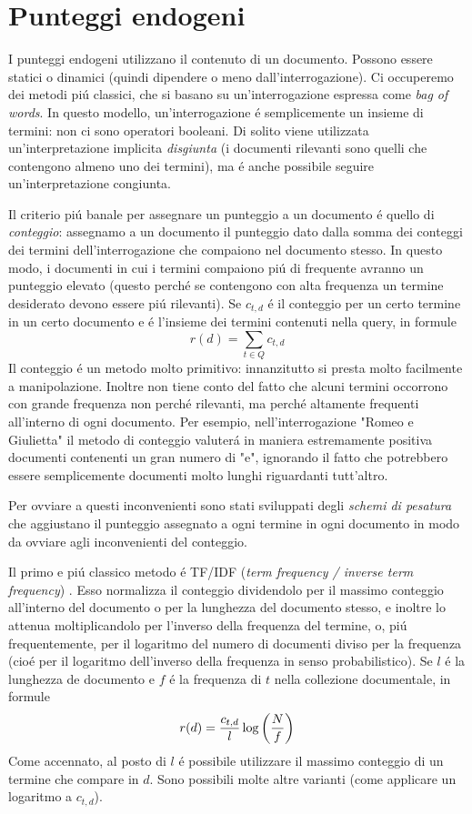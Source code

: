 \section{Punteggi endogeni}
I punteggi endogeni utilizzano il contenuto di un documento. Possono essere statici o dinamici (quindi dipendere o meno dall'interrogazione). Ci occuperemo dei metodi piú classici, che si basano su un'interrogazione espressa come \textit{bag of words}. In questo modello, un'interrogazione é semplicemente un insieme di termini: non ci sono operatori booleani. Di solito viene utilizzata un'interpretazione implicita \textit{disgiunta} (i documenti rilevanti sono quelli che contengono almeno uno dei termini), ma é anche possibile seguire un'interpretazione congiunta.

Il criterio piú banale per assegnare un punteggio a un documento é quello di \textit{conteggio}: assegnamo a un documento il punteggio dato dalla somma dei conteggi dei termini dell'interrogazione che compaiono nel documento stesso. In questo modo, i documenti in cui i termini compaiono piú di frequente avranno un punteggio elevato (questo perché se contengono con alta frequenza un termine desiderato devono essere piú rilevanti). Se $c_{t, d}$ é il conteggio per un certo termine in un certo documento e  é l'insieme dei termini contenuti nella query, in formule
\begin{equation*}
    r(d) = \sum_{t \in Q}{c_{t, d}}
\end{equation*}
Il conteggio é un metodo molto primitivo: innanzitutto si presta molto facilmente a manipolazione. Inoltre non tiene conto del fatto che alcuni termini occorrono con grande frequenza non perché rilevanti, ma perché altamente frequenti all'interno di ogni documento. Per esempio, nell'interrogazione "Romeo e Giulietta" il metodo di conteggio valuterá in maniera estremamente positiva documenti contenenti un gran numero di "e", ignorando il fatto che potrebbero essere semplicemente documenti molto lunghi riguardanti tutt'altro.

Per ovviare a questi inconvenienti sono stati sviluppati degli \textit{schemi di pesatura} che aggiustano il punteggio assegnato a ogni termine in ogni documento in modo da ovviare agli inconvenienti del conteggio.

Il primo e piú classico metodo é TF/IDF (\textit{term frequency / inverse term frequency}) \cite{tfidf}. Esso normalizza il conteggio dividendolo per il massimo conteggio all'interno del documento o per la lunghezza del documento stesso, e inoltre lo attenua moltiplicandolo per l'inverso della frequenza del termine, o, piú frequentemente, per il logaritmo del numero di documenti diviso per la frequenza (cioé per il logaritmo dell'inverso della frequenza in senso probabilistico). Se $l$ é la lunghezza de documento e $f$ é la frequenza di $t$ nella collezione documentale, in formule
\begin{equation*}
    r(d) = \frac{c_{t, d}}{l}\log\left(\frac{N}{f}\right)
\end{equation*}
Come accennato, al posto di $l$ é possibile utilizzare il massimo conteggio di un termine che compare in $d$. Sono possibili molte altre varianti (come applicare un logaritmo a $c_{t, d}$).

